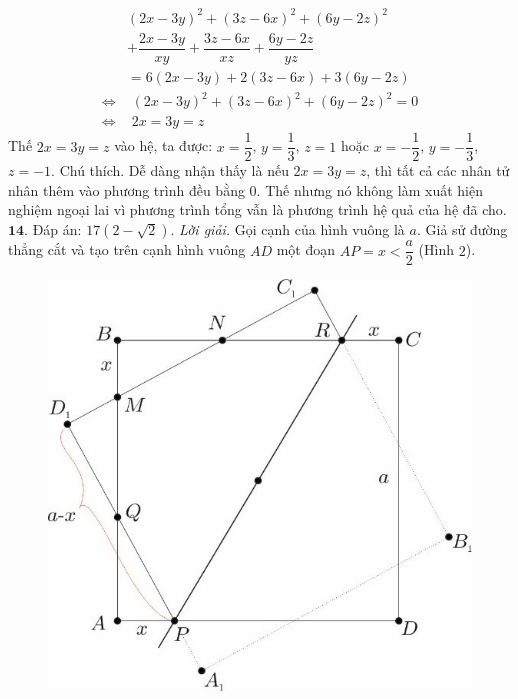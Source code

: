 \begin{multicols}{2}
	\begin{align*}
		&{\left( {2x - 3y} \right)^2} + {\left( {3z - 6x} \right)^2} + {\left( {6y - 2z} \right)^2} \\
		&+ \dfrac{{2x - 3y}}{{xy}} + \dfrac{{3z - 6x}}{{xz}} + \dfrac{{6y - 2z}}{{yz}}\\
		&= 6\left( {2x \!-\! 3y} \right) \!+\! 2\left( {3z \!-\! 6x} \right) \!+\! 3\left( {6y \!-\! 2z} \right)\\
		\Leftrightarrow &\,\,{\left( {2x \!-\! 3y} \right)^2} \!+\! {\left( {3z \!-\! 6x} \right)^2} \!+\! {\left( {6y \!-\! 2z} \right)^2} \!=\! 0\\
		\Leftrightarrow &\,\,2x = 3y = z
	\end{align*}
	Thế $2x = 3y = z$ vào hệ, ta được:  $x = \dfrac{1}{2}$, $y = \dfrac{1}{3}$, $z =1$ hoặc $x = - \dfrac{1}{2}$, $y = - \dfrac{1}{3}$,  $z = -1$.
	\vskip 0.1cm 
	Chú thích. Dễ dàng nhận thấy là nếu  $2x = 3y = z$, thì tất cả các nhân tử nhân thêm vào phương trình đều bằng $0$. Thế nhưng nó không làm xuất hiện nghiệm ngoại lai vì phương trình tổng vẫn là phương trình hệ quả của hệ đã cho.
	\vskip 0.1cm
	$\pmb{14.}$ Đáp án:  $17\left( {2 - \sqrt 2 } \right)$.
	\vskip 0.1cm 
	\textit{Lời giải.} Gọi cạnh của hình vuông là $a$. Giả sử đường thẳng cắt và tạo trên cạnh hình vuông $AD$ một đoạn $AP = x < \dfrac{a}{2}$  (Hình $2$).
	\begin{figure}[H]
		\vspace*{-5pt}
		\centering
		\captionsetup{labelformat= empty, justification=centering}
		\includegraphics[width= 1\linewidth]{1a}

\end{figure}
\end{multicols}
